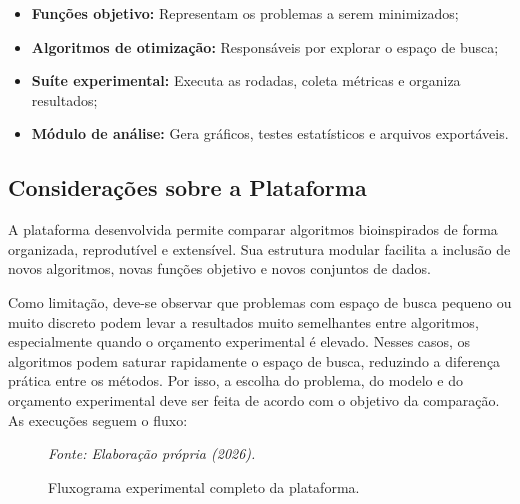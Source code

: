 \documentclass[12pt, a4paper, oneside]{report}
\begin{document}
\begin{itemize} 
    \item \textbf{Funções objetivo:} Representam os problemas a serem minimizados; 
    \item \textbf{Algoritmos de otimização:} Responsáveis por explorar o espaço de busca; 
    \item \textbf{Suíte experimental:} Executa as rodadas, coleta métricas e organiza resultados; 
    \item \textbf{Módulo de análise:} Gera gráficos, testes estatísticos e arquivos exportáveis. 
\end{itemize}

\subsection{Considerações sobre a Plataforma}
A plataforma desenvolvida permite comparar algoritmos bioinspirados de forma organizada, reprodutível e extensível. Sua estrutura modular facilita a inclusão de novos algoritmos, novas funções objetivo e novos conjuntos de dados.

Como limitação, deve-se observar que problemas com espaço de busca pequeno ou muito discreto podem levar a resultados muito semelhantes entre algoritmos, especialmente quando o orçamento experimental é elevado. Nesses casos, os algoritmos podem saturar rapidamente o espaço de busca, reduzindo a diferença prática entre os métodos. Por isso, a escolha do problema, do modelo e do orçamento experimental deve ser feita de acordo com o objetivo da comparação. As execuções seguem o fluxo:

\begin{figure}[htbp] 
\centering 
\caption{Fluxograma experimental completo da plataforma.} 
\vspace{0.2cm}
\par\vspace{0.2cm}
\centerline{\small \textit{Fonte: Elaboração própria (2026).}}
\label{fig:fluxo_exp}
\end{figure}
\end{document}
